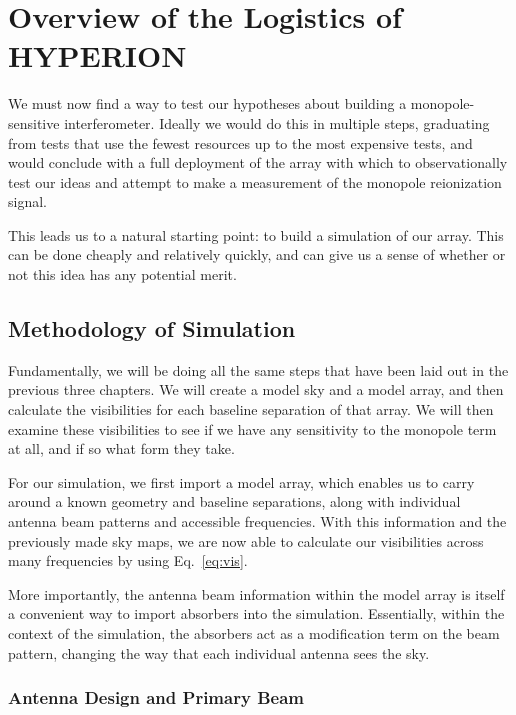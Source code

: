 \chapter{Overview of the Logistics of HYPERION}
\label{chap:logistics}

We must now find a way to test our hypotheses about building a 
monopole-sensitive interferometer. Ideally we would do this in multiple steps, 
graduating from tests that use the fewest resources up to the most expensive 
tests, and would conclude with a full deployment of the array with which to 
observationally test our ideas and attempt to make a measurement of the 
monopole reionization signal. 

This leads us to a natural starting point: to build a simulation of our array.  
This can be done cheaply and relatively quickly, and can give us a sense of 
whether or not this idea has any potential merit.

\section{Methodology of Simulation}

Fundamentally, we will be doing all the same steps that have been laid out in 
the previous three chapters. We will create a model sky and a model array, and 
then calculate the visibilities for each baseline separation of that array. We 
will then examine these visibilities to see if we have any sensitivity to the 
monopole term at all, and if so what form they take.

For our simulation, we first import a model array, which enables us to carry 
around a known geometry and baseline separations, along with individual antenna 
beam patterns and accessible frequencies. With this information and the 
previously made sky maps, we are now able to calculate our visibilities across 
many frequencies by using Eq.~\eqref{eq:vis}.

More importantly, the antenna beam information within the model array is itself 
a convenient way to import absorbers into the simulation.  Essentially, within 
the context of the simulation, the absorbers act as a modification term on the 
beam pattern, changing the way that each individual antenna sees the sky.

\subsection{Antenna Design and Primary Beam}

